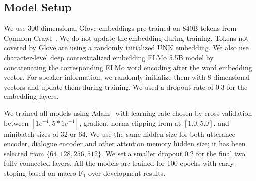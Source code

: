 \subsection{Model Setup}
\label{ssec:snt:exp-setup}

We use 300-dimensional Glove embeddings pre-trained on 840B tokens
from Common Crawl~\cite{pennington2014glove}. We do not update the
embedding during training. Tokens not covered by Glove are using a
randomly initialized UNK embedding. We also use character-level deep
contextualized embedding ELMo 5.5B model by concatenating the
corresponding ELMo word encoding after the word embedding
vector. For speaker information, we randomly initialize them with 8
dimensional vectors and update them during training. We used a
dropout rate of 0.3 for the embedding layers.

We trained all models using Adam~\cite{kingma2014adam} with learning
rate chosen by cross validation between $[1e^{-4}, 5*1e^{-4}]$,
gradient norms clipping from at $[1.0, 5.0]$, and minibatch sizes of
32 or 64. We use the same hidden size for both utterance encoder,
dialogue encoder and other attention memory hidden size; it has been
selected from $\{64, 128, 256, 512\}$. We set a smaller dropout 0.2
for the final two fully connected layers. All the models are trained
for 100 epochs with early-stoping based on macro $\text{F}_{1}$ over
development results.


